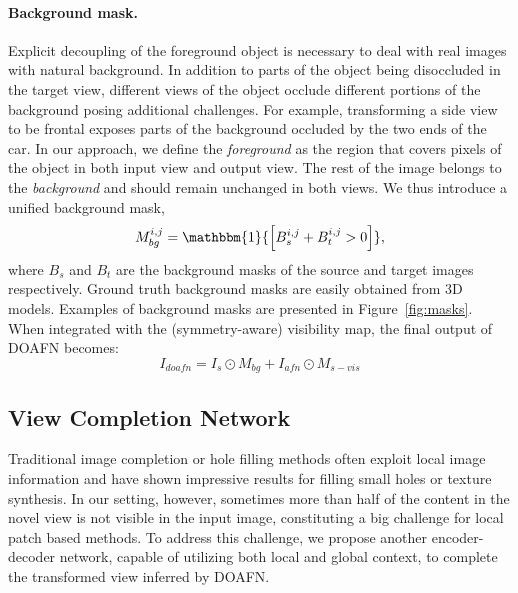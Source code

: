 \documentclass[10pt,twocolumn,letterpaper]{article}
\begin{document}
\paragraph{Background mask.}
Explicit decoupling of the foreground object is necessary to deal with real images with natural background. In addition to parts of the object being disoccluded in the target view, different views of the object occlude different portions of the background posing additional challenges. For example, transforming a side view to be frontal exposes parts of the background occluded by the two ends of the car. In our approach, we define the \emph{foreground} as the region that covers pixels of the object in both input view and output view. The rest of the image belongs to the \emph{background} and should remain unchanged in both views. We thus introduce a unified background mask, 
\begin{equation}
M_{bg}^{i,j} = \mathbbm{1}{\left[ B_s^{i,j} + B_t^{i,j} > 0 \right]},
\end{equation}
where $B_s$ and $B_t$ are the background masks of the source and target images respectively. Ground truth background masks are easily obtained from 3D models. Examples of background masks are presented in Figure~\ref{fig:masks}.
When integrated with the (symmetry-aware) visibility map, the final output of DOAFN becomes:
\begin{equation}
I_{doafn} = I_{s} \odot M_{bg} + I_{afn} \odot M_{s-vis}
\end{equation}

\vspace{-2mm}
\subsection{View Completion Network}
\label{sec:comp}
Traditional image completion or hole filling methods often exploit local image information \cite{efros_siggraph2001,barnes_siggraph2009,wexler_tpami2007} and have shown impressive results for filling small holes or texture synthesis. In our setting, however, sometimes more than half of the content in the novel view is not visible in the input image, constituting a big challenge for local patch based methods. To address this challenge, we propose another encoder-decoder network, capable of utilizing both local and global context, to complete the transformed view inferred by DOAFN.
\end{document}
